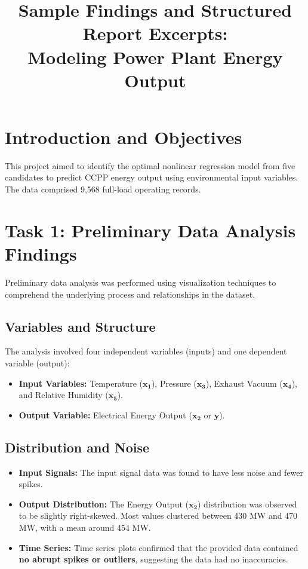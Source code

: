 \documentclass[12pt,a4paper]{article}
\title{Sample Findings and Structured Report Excerpts: \\ Modeling Power Plant Energy Output}
\author{}
\date{}
\begin{document}
\maketitle

\section{Introduction and Objectives}

This project aimed to identify the optimal nonlinear regression model from five candidates to predict CCPP energy output using environmental input variables. The data comprised 9,568 full-load operating records.

\section{Task 1: Preliminary Data Analysis Findings}

Preliminary data analysis was performed using visualization techniques to comprehend the underlying process and relationships in the dataset.

\subsection{Variables and Structure}

The analysis involved four independent variables (inputs) and one dependent variable (output):

\begin{itemize}
    \item \textbf{Input Variables:} Temperature ($\mathbf{x_1}$), Pressure ($\mathbf{x_3}$), Exhaust Vacuum ($\mathbf{x_4}$), and Relative Humidity ($\mathbf{x_5}$).
    \item \textbf{Output Variable:} Electrical Energy Output ($\mathbf{x_2}$ or $\mathbf{y}$).
\end{itemize}

\subsection{Distribution and Noise}

\begin{itemize}
    \item \textbf{Input Signals:} The input signal data was found to have less noise and fewer spikes.
    \item \textbf{Output Distribution:} The Energy Output ($\mathbf{x_2}$) distribution was observed to be slightly right-skewed. Most values clustered between 430 MW and 470 MW, with a mean around 454 MW.
    \item \textbf{Time Series:} Time series plots confirmed that the provided data contained \textbf{no abrupt spikes or outliers}, suggesting the data had no inaccuracies.
\end{itemize}
\end{document}
